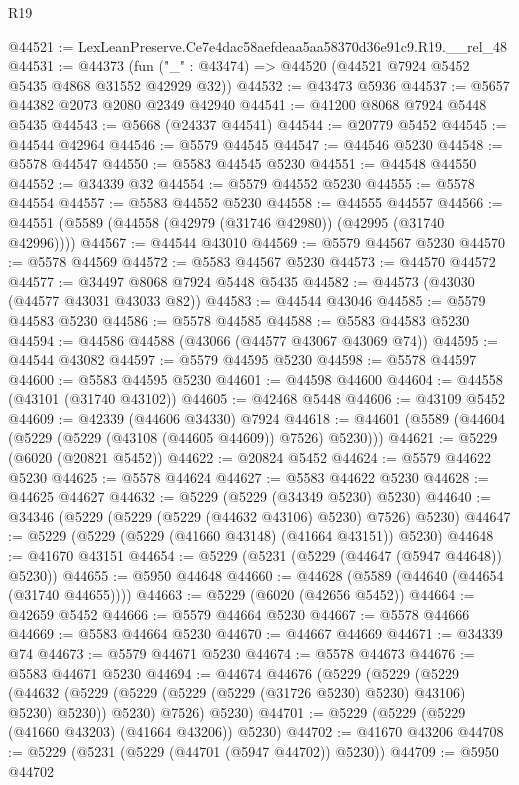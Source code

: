 \begin{lexlean}{R19}
\begin{coremodule}
@44521 := LexLeanPreserve.Ce7e4dac58aefdeaa5aa58370d36e91c9.R19.__rel_48
@44531 := @44373 (fun ("_" : @43474) => @44520 (@44521 @7924 @5452 @5435 @4868 @31552 @42929 @32))
@44532 := @43473 @5936
@44537 := @5657 @44382 @2073 @2080 @2349 @42940
@44541 := @41200 @8068 @7924 @5448 @5435
@44543 := @5668 (@24337 @44541)
@44544 := @20779 @5452
@44545 := @44544 @42964
@44546 := @5579 @44545
@44547 := @44546 @5230
@44548 := @5578 @44547
@44550 := @5583 @44545 @5230
@44551 := @44548 @44550
@44552 := @34339 @32
@44554 := @5579 @44552 @5230
@44555 := @5578 @44554
@44557 := @5583 @44552 @5230
@44558 := @44555 @44557
@44566 := @44551 (@5589 (@44558 (@42979 (@31746 @42980)) (@42995 (@31740 @42996))))
@44567 := @44544 @43010
@44569 := @5579 @44567 @5230
@44570 := @5578 @44569
@44572 := @5583 @44567 @5230
@44573 := @44570 @44572
@44577 := @34497 @8068 @7924 @5448 @5435
@44582 := @44573 (@43030 (@44577 @43031 @43033 @82))
@44583 := @44544 @43046
@44585 := @5579 @44583 @5230
@44586 := @5578 @44585
@44588 := @5583 @44583 @5230
@44594 := @44586 @44588 (@43066 (@44577 @43067 @43069 @74))
@44595 := @44544 @43082
@44597 := @5579 @44595 @5230
@44598 := @5578 @44597
@44600 := @5583 @44595 @5230
@44601 := @44598 @44600
@44604 := @44558 (@43101 (@31740 @43102))
@44605 := @42468 @5448
@44606 := @43109 @5452
@44609 := @42339 (@44606 @34330) @7924
@44618 := @44601 (@5589 (@44604 (@5229 (@5229 (@43108 (@44605 @44609)) @7526) @5230)))
@44621 := @5229 (@6020 (@20821 @5452))
@44622 := @20824 @5452
@44624 := @5579 @44622 @5230
@44625 := @5578 @44624
@44627 := @5583 @44622 @5230
@44628 := @44625 @44627
@44632 := @5229 (@5229 (@34349 @5230) @5230)
@44640 := @34346 (@5229 (@5229 (@5229 (@44632 @43106) @5230) @7526) @5230)
@44647 := @5229 (@5229 (@5229 (@41660 @43148) (@41664 @43151)) @5230)
@44648 := @41670 @43151
@44654 := @5229 (@5231 (@5229 (@44647 (@5947 @44648)) @5230))
@44655 := @5950 @44648
@44660 := @44628 (@5589 (@44640 (@44654 (@31740 @44655))))
@44663 := @5229 (@6020 (@42656 @5452))
@44664 := @42659 @5452
@44666 := @5579 @44664 @5230
@44667 := @5578 @44666
@44669 := @5583 @44664 @5230
@44670 := @44667 @44669
@44671 := @34339 @74
@44673 := @5579 @44671 @5230
@44674 := @5578 @44673
@44676 := @5583 @44671 @5230
@44694 := @44674
    @44676
    (@5229
      (@5229
        (@5229
          (@44632 (@5229 (@5229 (@5229 (@5229 (@31726 @5230) @5230) @43106) @5230) @5230))
          @5230)
        @7526)
      @5230)
@44701 := @5229 (@5229 (@5229 (@41660 @43203) (@41664 @43206)) @5230)
@44702 := @41670 @43206
@44708 := @5229 (@5231 (@5229 (@44701 (@5947 @44702)) @5230))
@44709 := @5950 @44702

\end{coremodule}
\end{lexlean}
